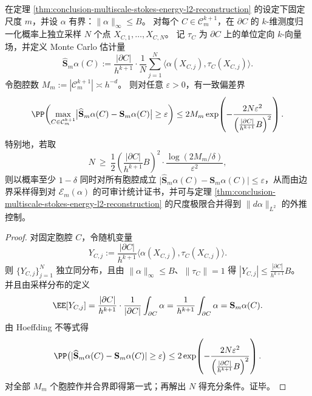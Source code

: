 \begin{proposition}[随机边界采样的斯托克斯证书]\label{prop:conclusion-stokes-random-sampling-certificate}
在定理 \ref{thm:conclusion-multiscale-stokes-energy-l2-reconstruction} 的设定下固定尺度 \(m\)，并设 \(\alpha\) 有界：\(\|\alpha\|_{\infty}\le B\)。
对每个 \(C\in\mathcal C_m^{k+1}\)，在 \(\partial C\) 的 \(k\)-维测度归一化概率上独立采样 \(N\) 个点 \(X_{C,1},\dots,X_{C,N}\)。
记 \(\tau_C\) 为 \(\partial C\) 上的单位定向 \(k\)-向量场，并定义 Monte Carlo 估计量
\[
\widehat{\mathbf S}_m\alpha(C)
:=\frac{|\partial C|}{h^{k+1}}\cdot \frac1N\sum_{j=1}^N \langle \alpha(X_{C,j}),\tau_C(X_{C,j})\rangle.
\]
令胞腔数 \(M_m:=|\mathcal C_m^{k+1}|\asymp h^{-d}\)。
则对任意 \(\varepsilon>0\)，有一致偏差界
\[
\PP\!\left(
\max_{C\in\mathcal C_m^{k+1}}
\bigl|\widehat{\mathbf S}_m\alpha(C)-\mathbf S_m\alpha(C)\bigr|
\ge \varepsilon
\right)
\le
2M_m\exp\!\left(
-\frac{2N\varepsilon^2}{\left(\frac{|\partial C|}{h^{k+1}}B\right)^2}
\right).
\]
特别地，若取
\[
N\ \ge\
\frac12\left(\frac{|\partial C|}{h^{k+1}}B\right)^2\cdot
\frac{\log(2M_m/\delta)}{\varepsilon^2},
\]
则以概率至少 \(1-\delta\) 同时对所有胞腔成立
\(
\bigl|\widehat{\mathbf S}_m\alpha(C)-\mathbf S_m\alpha(C)\bigr|\le \varepsilon
\)，从而由边界采样得到对 \(\mathcal E_m(\alpha)\) 的可审计统计证书，并可与定理 \ref{thm:conclusion-multiscale-stokes-energy-l2-reconstruction} 的尺度极限合并得到 \(\|d\alpha\|_{L^2}\) 的外推控制。
\end{proposition}

\begin{proof}
对固定胞腔 \(C\)，令随机变量
\[
Y_{C,j}:=\frac{|\partial C|}{h^{k+1}}\langle \alpha(X_{C,j}),\tau_C(X_{C,j})\rangle.
\]
则 \(\{Y_{C,j}\}_{j=1}^N\) 独立同分布，且由 \(\|\alpha\|_\infty\le B\)、\(\|\tau_C\|=1\) 得
\(
|Y_{C,j}|\le \frac{|\partial C|}{h^{k+1}}B
\)。
并且由采样分布的定义
\[
\EE[Y_{C,j}]
=\frac{|\partial C|}{h^{k+1}}\cdot \frac1{|\partial C|}\int_{\partial C}\alpha
=\frac1{h^{k+1}}\int_{\partial C}\alpha
=\mathbf S_m\alpha(C).
\]
由 Hoeffding 不等式得
\[
\PP\bigl(|\widehat{\mathbf S}_m\alpha(C)-\mathbf S_m\alpha(C)|\ge\varepsilon\bigr)
\le
2\exp\!\left(
-\frac{2N\varepsilon^2}{\left(\frac{|\partial C|}{h^{k+1}}B\right)^2}
\right).
\]
对全部 \(M_m\) 个胞腔作并合界即得第一式；再解出 \(N\) 得充分条件。证毕。
\end{proof}

